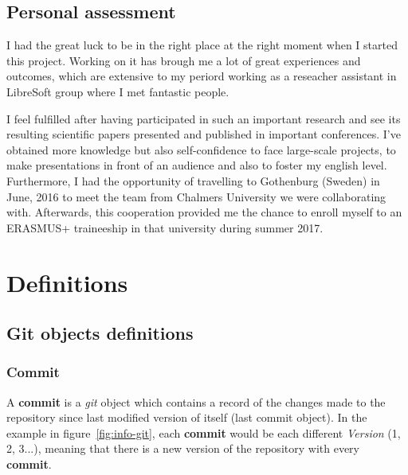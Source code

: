 \documentclass[a4paper, 12pt]{book}
\begin{document}
\section{Personal assessment}
\label{sec:assessment}
I had the great luck to be in the right place at the right moment when I started this project.
Working on it has brough me a lot of great experiences and outcomes, which are
extensive to my periord working as a reseacher assistant in LibreSoft group where I met fantastic people.\par
I feel fulfilled after having participated in such an important research and see its resulting scientific papers
presented and published in important conferences. I've obtained more knowledge but also self-confidence to face large-scale
projects, to make presentations in front of an audience and also to foster my english level. Furthermore,
I had the opportunity of travelling to Gothenburg (Sweden) in June, 2016 to meet the team from Chalmers University
we were collaborating with. Afterwards, this cooperation provided me the chance to enroll myself to an
ERASMUS+ traineeship in that university during summer 2017.\par
\cleardoublepage
\appendix
\chapter{Definitions}
\label{app:definitions}
\section{Git objects definitions}
\label{sec:git-definitions}
\subsection{Commit}
\label{ssec:git-commit}
A \textbf{commit} is a \emph{git} object which contains a record of the changes made to the repository since last modified
version of itself (last commit object). In the example in figure~\ref{fig:info-git}, each \textbf{commit} would be each different
\textit{Version} (1, 2, 3...), meaning that there is a new version of the repository with every \textbf{commit}.
\end{document}
